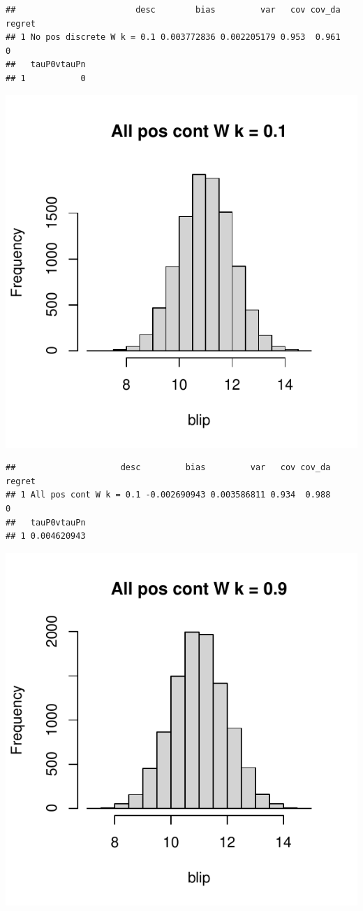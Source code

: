 \documentclass[11pt]{article}\usepackage[]{graphicx}\usepackage[table]{xcolor}
\makeatletter
\def\maxwidth{ %
  \ifdim\Gin@nat@width>\linewidth
    \linewidth
  \else
    \Gin@nat@width
  \fi
}
\newenvironment{kframe}{%
 \def\at@end@of@kframe{}%
 \ifinner\ifhmode%
  \def\at@end@of@kframe{\end{minipage}}%
  \begin{minipage}{\columnwidth}%
 \fi\fi%
 \def\FrameCommand##1{\hskip\@totalleftmargin \hskip-\fboxsep
 \colorbox{shadecolor}{##1}\hskip-\fboxsep
     \hskip-\linewidth \hskip-\@totalleftmargin \hskip\columnwidth}%
 \MakeFramed {\advance\hsize-\width
   \@totalleftmargin\z@ \linewidth\hsize
   \@setminipage}}%
 {\par\unskip\endMakeFramed%
 \at@end@of@kframe}
\newenvironment{knitrout}{}{} %
\makeatother
\begin{document}
\begin{knitrout}
\begin{kframe}\begin{verbatim}
##                        desc        bias         var   cov cov_da regret
## 1 No pos discrete W k = 0.1 0.003772836 0.002205179 0.953  0.961      0
##   tauP0vtauPn
## 1           0
\end{verbatim}
\end{kframe}
\includegraphics[width=\maxwidth]{figure/unnamed-chunk-4-6} 
\begin{kframe}\begin{verbatim}
##                     desc         bias         var   cov cov_da regret
## 1 All pos cont W k = 0.1 -0.002690943 0.003586811 0.934  0.988      0
##   tauP0vtauPn
## 1 0.004620943
\end{verbatim}
\end{kframe}
\includegraphics[width=\maxwidth]{figure/unnamed-chunk-4-7} 

\end{knitrout}
\end{document}
